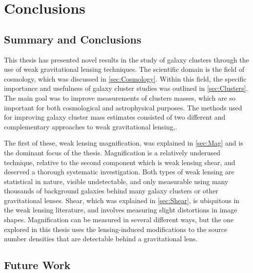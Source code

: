 
\chapter{Conclusions}
\label{ch:conc}


\section{Summary and Conclusions}
\label{sec:summary}

This thesis has presented novel results in the study of galaxy clusters through the use of weak gravitational lensing techniques. The scientific domain is the field of cosmology, which was discussed in \autoref{sec:Cosmology}. Within this field, the specific importance and usefulness of galaxy cluster studies was outlined in \autoref{sec:Clusters}. The main goal was to improve measurements of clusters masses, which are so important for both cosmological and astrophysical purposes. The methods used for improving galaxy cluster mass estimates consisted of two different and complementary approaches to weak gravitational lensing,. 

The first of these, weak lensing magnification, was explained in \autoref{sec:Mag} and is the dominant focus of the thesis. Magnification is a relatively underused technique, relative to the second component which is weak lensing shear, and deserved a thorough systematic investigation. Both types of weak lensing are statistical in nature, visible undetectable, and only measurable using many thousands of background galaxies behind many galaxy clusters or other gravitational lenses. Shear, which was explained in \autoref{sec:Shear}, is ubiquitous in the weak lensing literature, and involves measuring slight distortions in image shapes. Magnification can be measured in several different ways, but the one explored in this thesis uses the lensing-induced modifications to the source number densities that are detectable behind a gravitational lens.

\section{Future Work}
\label{sec:future}


\endinput
Any text after an \endinput is ignored.
You could put scraps here or things in progress.
